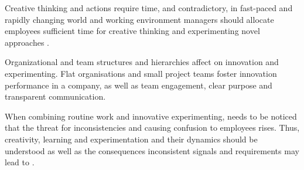 Creative thinking and actions require time, and contradictory, in fast-paced and rapidly changing world and working environment managers should allocate employees sufficient time for creative thinking and experimenting novel approaches \citep{shalley2004leaders}.

Organizational and team structures and hierarchies affect on innovation and experimenting. Flat organisations and small project teams foster innovation performance in a company, as well as team engagement, clear purpose and transparent communication. 

When combining routine work and innovative experimenting, needs to be noticed that the threat for inconsistencies and causing confusion to employees rises. Thus, creativity, learning and experimentation and their dynamics should be understood as well as the consequences inconsistent signals and requirements may lead to \citep{lee2004mixed}.

